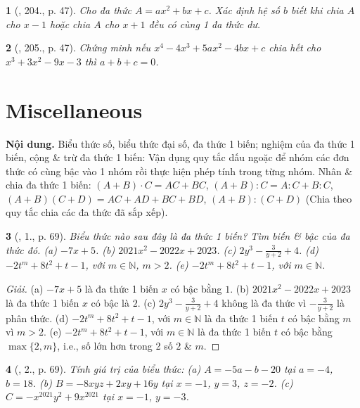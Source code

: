\documentclass{article}
\newtheorem{baitoan}{}
\begin{document}
\begin{baitoan}[\cite{Tuyen_Toan_7}, 204., p. 47]
	Cho đa thức $A = ax^2 + bx + c$. Xác định hệ số $b$ biết khi chia $A$ cho $x - 1$ hoặc chia $A$ cho $x + 1$ đều có cùng 1 đa thức dư.
\end{baitoan}

\begin{baitoan}[\cite{Tuyen_Toan_7}, 205., p. 47]
	Chứng minh nếu $x^4 - 4x^3 + 5ax^2 - 4bx + c$ chia hết cho $x^3 + 3x^2 - 9x - 3$ thì $a + b + c = 0$.
\end{baitoan}


\section{Miscellaneous}
\textsf{\textbf{Nội dung.} Biểu thức số, biểu thức đại số, đa thức 1 biến; nghiệm của đa thức 1 biến, cộng \& trừ đa thức 1 biến:} Vận dụng quy tắc dấu ngoặc để nhóm các đơn thức có cùng bậc vào 1 nhóm rồi thực hiện phép tính trong từng nhóm. \textsf{Nhân \& chia đa thức 1 biến:} $(A + B)\cdot C = AC + BC$, $(A + B):C = A:C + B:C$, $(A + B)(C + D) = AC + AD + BC + BD$, $(A + B):(C + D)$ (Chia theo quy tắc chia các đa thức đã sắp xếp).

\begin{baitoan}[\cite{SGK_Toan_7_Canh_Dieu_tap_2}, 1., p. 69]
	Biểu thức nào sau đây là đa thức 1 biến? Tìm biến \& bậc của đa thức đó. (a) $-7x + 5$. (b) $2021x^2 - 2022x + 2023$. (c) $2y^3 - \frac{3}{y + 2} + 4$. (d) $-2t^m + 8t^2 + t - 1$, với $m\in\mathbb{N}$, $m > 2$. (e) $-2t^m + 8t^2 + t - 1$, với $m\in\mathbb{N}$.
\end{baitoan}

\begin{proof}[Giải]
	(a) $-7x + 5$ là đa thức 1 biến $x$ có bậc bằng $1$. (b) $2021x^2 - 2022x + 2023$ là đa thức 1 biến $x$ có bậc là $2$. (c) $2y^3 - \frac{3}{y + 2} + 4$ không là đa thức vì $- \frac{3}{y + 2}$ là phân thức. (d) $-2t^m + 8t^2 + t - 1$, với $m\in\mathbb{N}$ là đa thức 1 biến $t$ có bậc bằng $m$ vì $m > 2$. (e) $-2t^m + 8t^2 + t - 1$, với $m\in\mathbb{N}$ là đa thức 1 biến $t$ có bậc bằng $\max\{2,m\}$, i.e., số lớn hơn trong 2 số $2$ \& $m$.
\end{proof}

\begin{baitoan}[\cite{SGK_Toan_7_Canh_Dieu_tap_2}, 2., p. 69]
	Tính giá trị của biểu thức: (a) $A = -5a - b - 20$ tại $a = -4$, $b = 18$. (b) $B = -8xyz + 2xy + 16y$ tại $x = -1$, $y = 3$, $z = -2$. (c) $C = -x^{2021}y^2 + 9x^{2021}$ tại $x = -1$, $y = -3$.
\end{baitoan}
\end{document}
